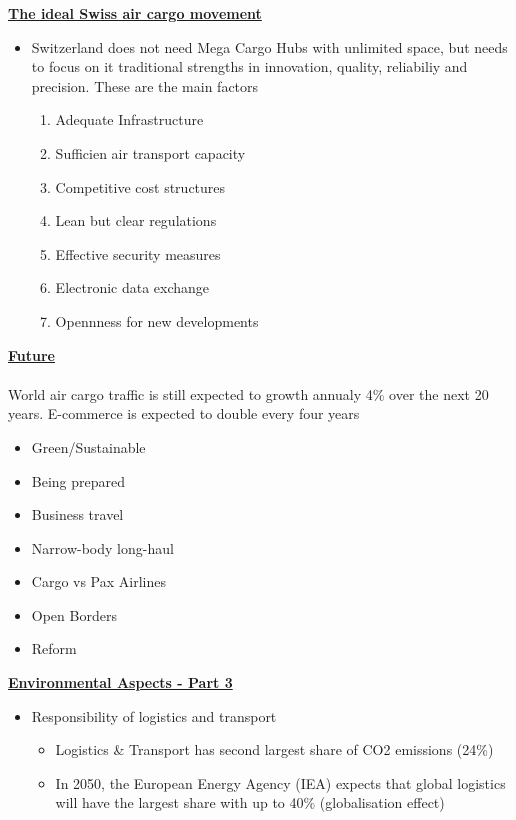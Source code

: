 \documentclass[9pt, landscape, fleqn]{scrartcl}
\begin{document}
\begin{multicols*}{3}
\begin{center}
\end{center}
\underline{\textbf{The ideal Swiss air cargo movement}}
\begin{itemize}
    \item Switzerland does not need Mega Cargo Hubs with unlimited space, but needs to focus on it traditional strengths in innovation, quality, reliabiliy and precision. These are the main factors
    \begin{enumerate}
        \item Adequate Infrastructure
        \item Sufficien air transport capacity 
        \item Competitive cost structures 
        \item Lean but clear regulations 
        \item Effective security measures
        \item Electronic data exchange 
        \item Opennness for new developments 
    \end{enumerate}
\end{itemize}
\underline{\textbf{Future}} \\ \\
World air cargo traffic is still expected to growth annualy 4\% over the next 20 years. E-commerce is expected to double every four years
\begin{itemize}
    \item Green/Sustainable 
    \item Being prepared 
    \item Business travel
    \item Narrow-body long-haul 
    \item Cargo vs Pax Airlines 
    \item Open Borders 
    \item Reform 
\end{itemize}
\underline{\textbf{Environmental Aspects - Part 3}}
\begin{itemize}
    \item Responsibility of logistics and transport 
    \begin{itemize}
        \item Logistics \& Transport has second largest share of CO2 emissions (24\%)
        \item In 2050, the European Energy Agency (IEA) expects that global logistics will have the largest share with up to 40\% (globalisation effect)
    \end{itemize}

\end{itemize}
\end{multicols*}
\end{document}
